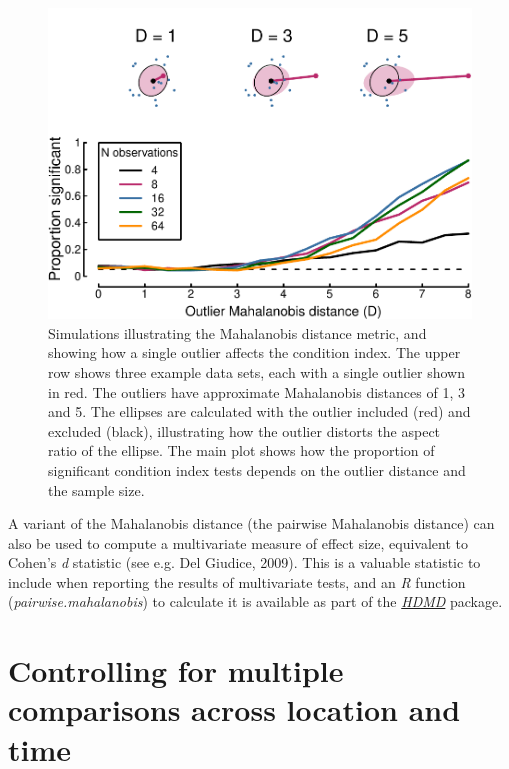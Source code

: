 \documentclass[]{article}
\begin{document}
\begin{figure}

{\centering \includegraphics{manuscript_files/figure-latex/outlierplot-1} 

}

\caption{Simulations illustrating the Mahalanobis distance metric, and showing how a single outlier affects the condition index. The upper row shows three example data sets, each with a single outlier shown in red. The outliers have approximate Mahalanobis distances of 1, 3 and 5. The ellipses are calculated with the outlier included (red) and excluded (black), illustrating how the outlier distorts the aspect ratio of the ellipse. The main plot shows how the proportion of significant condition index tests depends on the outlier distance and the sample size.}\label{fig:outlierplot}
\end{figure}

A variant of the Mahalanobis distance (the pairwise Mahalanobis distance) can also be used to compute a multivariate measure of effect size, equivalent to Cohen's \emph{d} statistic (see e.g. Del Giudice, 2009). This is a valuable statistic to include when reporting the results of multivariate tests, and an \emph{R} function (\emph{pairwise.mahalanobis}) to calculate it is available as part of the \href{https://CRAN.R-project.org/package=HDMD}{\emph{HDMD}} package.

\hypertarget{controlling-for-multiple-comparisons-across-location-and-time}{%
\section{Controlling for multiple comparisons across location and time}\label{controlling-for-multiple-comparisons-across-location-and-time}}
\end{document}
